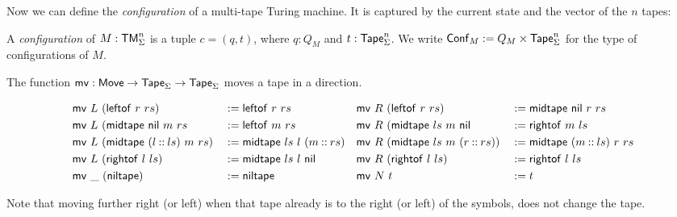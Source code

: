 
Now we can define the \emph{configuration} of a multi-tape Turing machine.  It is captured by the current state and the vector of the $n$ tapes:
\begin{definition}[Configuration]
  \label{def:config}
  A \emph{configuration} of $M: \mathsf{TM}_\Sigma^n$ is a tuple $c = (q, t)$, where $q: Q_M$ and $t: \mathsf{Tape}_\Sigma^n$.  We write
  $\mathsf{Conf}_M := Q_M \times \mathsf{Tape}_\Sigma^n$ for the type of configurations of $M$.
\end{definition}

The function $\mathsf{mv} : \mathsf{Move} \rightarrow \mathsf{Tape}_\Sigma \rightarrow \mathsf{Tape}_\Sigma$ moves a tape in a direction.
\begin{definition}
  \footnotesize
  \begin{alignat*}{4}
    & \mathsf{mv}~L~(\mathsf{leftof}~r~rs)                &&:= \mathsf{leftof}~r~rs
    && \mathsf{mv}~R~(\mathsf{leftof}~r~rs)               &&:= \mathsf{midtape}~\mathsf{nil}~r~rs \\
    & \mathsf{mv}~L~(\mathsf{midtape}~\mathsf{nil}~m~rs           &&:= \mathsf{leftof}~m~rs
    && \mathsf{mv}~R~(\mathsf{midtape}~ls~m~\mathsf{nil}          &&:= \mathsf{rightof}~m~ls \\
    & \mathsf{mv}~L~(\mathsf{midtape}~(l \mathbin{::} ls)~m~rs)  &&:= \mathsf{midtape}~ls~l~(m \mathbin{::} rs)
    && \mathsf{mv}~R~(\mathsf{midtape}~ls~m~(r \mathbin{::} rs)) &&:= \mathsf{midtape}~(m \mathbin{::} ls)~r~rs \\
    & \mathsf{mv}~L~(\mathsf{rightof}~l~ls)               &&:= \mathsf{midtape}~ls~l~\mathsf{nil}
    && \mathsf{mv}~R~(\mathsf{rightof}~l~ls)              &&:= \mathsf{rightof}~l~ls \\
    & \mathsf{mv}~\_~(\mathsf{niltape})                   &&:= \mathsf{niltape}
    && \mathsf{mv}~N~t                                &&:= t
  \end{alignat*}
\end{definition}
Note that moving further right (or left) when that tape already is to the right (or left) of the symbols, does not change the tape.

